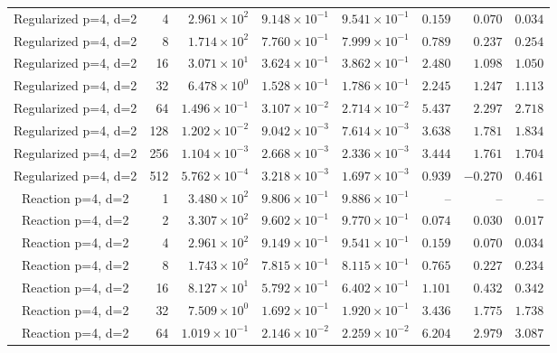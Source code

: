 \begin{longtable}{@{}crrrrrrr@{}}
Regularized p=4, d=2 & 4 & $2.961\!\times\!10^{2}$ & $9.148\!\times\!10^{-1}$ & $9.541\!\times\!10^{-1}$ & $0.159$ & $0.070$ & $0.034$ \\
Regularized p=4, d=2 & 8 & $1.714\!\times\!10^{2}$ & $7.760\!\times\!10^{-1}$ & $7.999\!\times\!10^{-1}$ & $0.789$ & $0.237$ & $0.254$ \\
Regularized p=4, d=2 & 16 & $3.071\!\times\!10^{1}$ & $3.624\!\times\!10^{-1}$ & $3.862\!\times\!10^{-1}$ & $2.480$ & $1.098$ & $1.050$ \\
Regularized p=4, d=2 & 32 & $6.478\!\times\!10^{0}$ & $1.528\!\times\!10^{-1}$ & $1.786\!\times\!10^{-1}$ & $2.245$ & $1.247$ & $1.113$ \\
Regularized p=4, d=2 & 64 & $1.496\!\times\!10^{-1}$ & $3.107\!\times\!10^{-2}$ & $2.714\!\times\!10^{-2}$ & $5.437$ & $2.297$ & $2.718$ \\
Regularized p=4, d=2 & 128 & $1.202\!\times\!10^{-2}$ & $9.042\!\times\!10^{-3}$ & $7.614\!\times\!10^{-3}$ & $3.638$ & $1.781$ & $1.834$ \\
Regularized p=4, d=2 & 256 & $1.104\!\times\!10^{-3}$ & $2.668\!\times\!10^{-3}$ & $2.336\!\times\!10^{-3}$ & $3.444$ & $1.761$ & $1.704$ \\
Regularized p=4, d=2 & 512 & $5.762\!\times\!10^{-4}$ & $3.218\!\times\!10^{-3}$ & $1.697\!\times\!10^{-3}$ & $0.939$ & $-0.270$ & $0.461$ \\
Reaction p=4, d=2 & 1 & $3.480\!\times\!10^{2}$ & $9.806\!\times\!10^{-1}$ & $9.886\!\times\!10^{-1}$ & -- & -- & -- \\
Reaction p=4, d=2 & 2 & $3.307\!\times\!10^{2}$ & $9.602\!\times\!10^{-1}$ & $9.770\!\times\!10^{-1}$ & $0.074$ & $0.030$ & $0.017$ \\
Reaction p=4, d=2 & 4 & $2.961\!\times\!10^{2}$ & $9.149\!\times\!10^{-1}$ & $9.541\!\times\!10^{-1}$ & $0.159$ & $0.070$ & $0.034$ \\
Reaction p=4, d=2 & 8 & $1.743\!\times\!10^{2}$ & $7.815\!\times\!10^{-1}$ & $8.115\!\times\!10^{-1}$ & $0.765$ & $0.227$ & $0.234$ \\
Reaction p=4, d=2 & 16 & $8.127\!\times\!10^{1}$ & $5.792\!\times\!10^{-1}$ & $6.402\!\times\!10^{-1}$ & $1.101$ & $0.432$ & $0.342$ \\
Reaction p=4, d=2 & 32 & $7.509\!\times\!10^{0}$ & $1.692\!\times\!10^{-1}$ & $1.920\!\times\!10^{-1}$ & $3.436$ & $1.775$ & $1.738$ \\
Reaction p=4, d=2 & 64 & $1.019\!\times\!10^{-1}$ & $2.146\!\times\!10^{-2}$ & $2.259\!\times\!10^{-2}$ & $6.204$ & $2.979$ & $3.087$ \\

\end{longtable}
